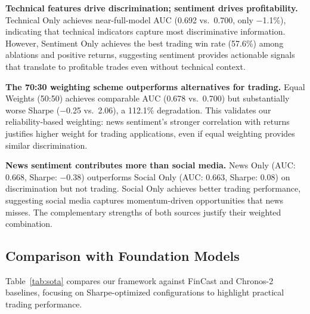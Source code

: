 \documentclass[a4paper,10pt,conference]{IEEEtran}
\begin{document}
\textbf{Technical features drive discrimination; sentiment drives profitability.} Technical Only achieves near-full-model AUC (0.692 vs.\ 0.700, only $-$1.1\%), indicating that technical indicators capture most discriminative information. However, Sentiment Only achieves the best trading win rate (57.6\%) among ablations and positive returns, suggesting sentiment provides actionable signals that translate to profitable trades even without technical context.

\textbf{The 70:30 weighting scheme outperforms alternatives for trading.} Equal Weights (50:50) achieves comparable AUC (0.678 vs.\ 0.700) but substantially worse Sharpe ($-$0.25 vs.\ 2.06), a 112.1\% degradation. This validates our reliability-based weighting: news sentiment's stronger correlation with returns~\cite{nyakurukwa2024} justifies higher weight for trading applications, even if equal weighting provides similar discrimination.

\textbf{News sentiment contributes more than social media.} News Only (AUC: 0.668, Sharpe: $-$0.38) outperforms Social Only (AUC: 0.663, Sharpe: 0.08) on discrimination but not trading. Social Only achieves better trading performance, suggesting social media captures momentum-driven opportunities that news misses. The complementary strengths of both sources justify their weighted combination.

\subsection{Comparison with Foundation Models}

Table~\ref{tab:sota} compares our framework against FinCast and Chronos-2 baselines, focusing on Sharpe-optimized configurations to highlight practical trading performance.
\end{document}
